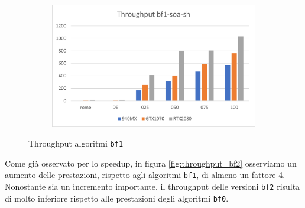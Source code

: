 \documentclass[12pt,a4paper,oneside]{book}
\begin{document}
\begin{figure}[b]
\begin{subfigure}{.5\textwidth}
		\end{subfigure}%
		\begin{subfigure}{.5\textwidth}
			\centering
			\includegraphics[width=\textwidth]{throughput_bf1-soa-sh}
		\end{subfigure}
		\caption{Throughput algoritmi \texttt{bf1}}
		\label{fig:throughput_bf1}
	\end{figure}

	Come già osservato per lo speedup, in figura \ref{fig:throughput_bf2} osserviamo un aumento delle prestazioni, rispetto agli algoritmi \texttt{bf1}, di almeno un fattore 4. Nonostante sia un incremento importante, il throughput delle versioni \texttt{bf2} risulta di molto inferiore rispetto alle prestazioni degli algoritmi \texttt{bf0}.
\end{document}
